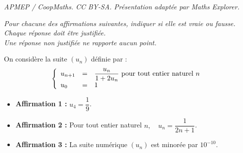 \documentclass[10pt]{article}
\begin{document}
\noindent\textit{APMEP / CoopMaths. CC BY-SA. Présentation adaptée par Maths Explorer.}\par\medskip
\emph{Pour chacune des affirmations suivantes, indiquer si elle est vraie ou fausse.\\
Chaque réponse doit être justifiée.\\
Une réponse non justifiée ne rapporte aucun point.}

On considère la suite $\left(u_{n}\right)$ définie par :
\[\left\{\begin{array}{l c l}u_{n + 1} &=& \dfrac{u_{n}}{1 + 2 u_{n}} \text { pour tout entier naturel } n \\ u_{0} &=& 1\end{array}\right.\]

\begin{itemize}
\item \textbf{Affirmation 1 :} \og{} $u_{4} = \dfrac{1}{9}$. \fg{}
\item \textbf{Affirmation 2 :} \og{}Pour tout entier naturel $n, \quad u_{n} = \dfrac{1}{2 n + 1}$.\fg{}
\item \textbf{Affirmation 3 :} \og{}La suite numérique $\left(u_{n}\right)$ est minorée par $10^{-10}$.\fg{}
\end{itemize}
\end{document}
